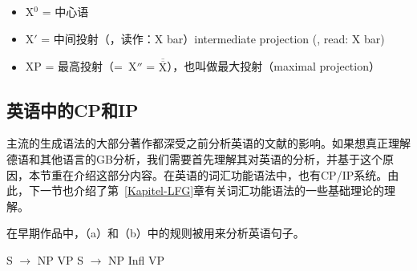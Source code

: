 \begin{itemize}
\item X$^0$ = 中心语
\item X$'$ = 中间投射（\xbar ，读作：X bar）intermediate projection (\xbar, read: X bar) 
\item XP = 最高投射（=~X$''$ = $\overline{\overline{\mbox{X}}}$），也叫做最大投射（maximal projection） 
\end{itemize}

\subsection{英语中的CP和IP}
\label{Abschnitt-GB-CP-IP-System-Englisch}\label{sec-GB-CP-IP-System-English}

主流的生成语法的大部分著作都深受之前分析英语的文献的影响。如果想真正理解德语和其他语言的GB分析，我们需要首先理解其对英语的分析，并基于这个原因，本节重在介绍这部分内容。在英语的词汇功能语法中，也有CP/IP系统。由此，下一节也介绍了第~\ref{Kapitel-LFG}章有关词汇功能语法的一些基础理论的理解。

在早期作品中，（a）和（b）中的规则被用来分析英语句子\citep[]{Chomsky81a}。

\eal
\ex S $\to$ NP VP
\ex S $\to$ NP Infl VP
\zl


